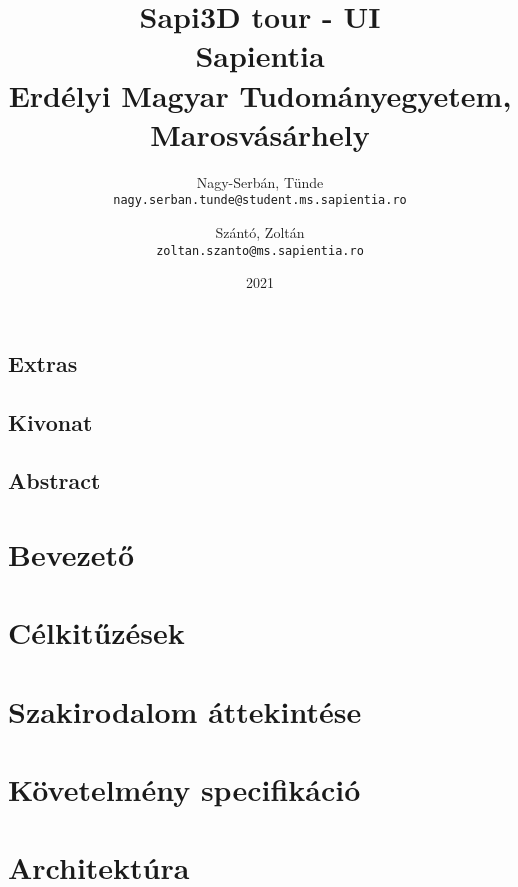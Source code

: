 \documentclass[12pt, twosides]{report}
\title{
	{Sapi3D tour - UI}\\
	{\large Sapientia\\
	Erdélyi Magyar Tudományegyetem, Marosvásárhely}
}
\author{
	Nagy-Serbán, Tünde\\
	\texttt{nagy.serban.tunde@student.ms.sapientia.ro}
	\and
	Szántó, Zoltán\\
	\texttt{zoltan.szanto@ms.sapientia.ro}	
}
\date{2021}
\begin{document}


\section*{Extras}

\pagebreak



\section*{Kivonat}

\pagebreak

\section*{Abstract}

\pagebreak


\tableofcontents

\listoffigures

\listoftables

\chapter{Bevezető}


\chapter{Célkitűzések}


\chapter{Szakirodalom áttekintése}


\chapter{Követelmény specifikáció}




\chapter{Architektúra}
\end{document}
